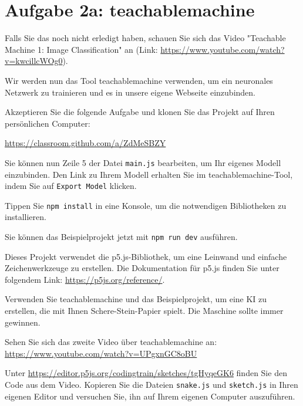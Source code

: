 \documentclass[12pt,a4paper]{report}
\begin{document}
\newpage

\section*{Aufgabe 2a: teachablemachine}

\begin{ex}
    Falls Sie das noch nicht erledigt haben, schauen Sie sich das Video "Teachable Machine 1: Image Classification" an (Link: \url{https://www.youtube.com/watch?v=kwcillcWOg0}).
\end{ex}

Wir werden nun das Tool teachablemachine verwenden, um ein neuronales Netzwerk zu trainieren und es in unsere eigene Webseite einzubinden.

\begin{ex}
    Akzeptieren Sie die folgende Aufgabe und klonen Sie das Projekt auf Ihren persönlichen Computer:
    
    \url{https://classroom.github.com/a/ZdMeSBZY}

    Sie können nun Zeile 5 der Datei \verb|main.js| bearbeiten, um Ihr eigenes Modell einzubinden. Den Link zu Ihrem Modell erhalten Sie im teachablemachine-Tool, indem Sie auf \verb|Export Model| klicken.

    Tippen Sie \verb|npm install| in eine Konsole, um die notwendigen Bibliotheken zu installieren.

    Sie können das Beispielprojekt jetzt mit \verb|npm run dev| ausführen.

    Dieses Projekt verwendet die p5.js-Bibliothek, um eine Leinwand und einfache Zeichenwerkzeuge zu erstellen. Die Dokumentation für p5.js finden Sie unter folgendem Link: \url{https://p5js.org/reference/}.
\end{ex}

\begin{ex}
    Verwenden Sie teachablemachine und das Beispielprojekt, um eine KI zu erstellen, die mit Ihnen Schere-Stein-Papier spielt. Die Maschine sollte immer gewinnen.
\end{ex}

\begin{ex}
    Sehen Sie sich das zweite Video über teachablemachine an: \url{https://www.youtube.com/watch?v=UPgxnGC8oBU}
\end{ex}

\begin{ex}
    Unter \url{https://editor.p5js.org/codingtrain/sketches/tgHyqeGK6} finden Sie den Code aus dem Video. Kopieren Sie die Dateien \verb|snake.js| und \verb|sketch.js| in Ihren eigenen Editor und versuchen Sie, ihn auf Ihrem eigenen Computer auszuführen.
    
\end{ex}
\end{document}
